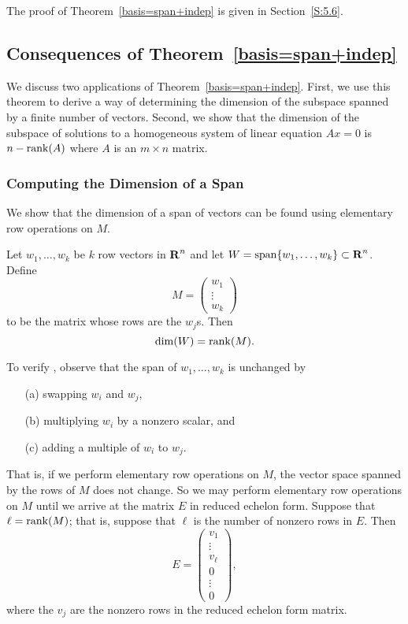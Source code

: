 \documentclass{ximera}
\begin{document}
The proof of Theorem~\ref{basis=span+indep} is given in Section~\ref{S:5.6}.


\subsection*{Consequences of Theorem~\protect\ref{basis=span+indep}}

We discuss two applications of Theorem~\ref{basis=span+indep}.  First,
we use this theorem to derive a way of determining the dimension of the
subspace spanned by a finite number of vectors.  Second, we show that the
dimension of the subspace of solutions to a homogeneous system of linear
equation $Ax=0$ is $n-{\rm rank}(A)$ where $A$ is an $m\times n$ matrix.

\subsubsection*{Computing the Dimension of a Span} 

We show that the dimension of a span of vectors can be found using
elementary row operations on $M$. 

\begin{lemma}  \label{L:computerank}
Let $w_1,\ldots,w_k$ be $k$ row vectors in $\mbox{$\bf{R}$}^n$ and let
$W={\rm span}\{w_1,\ldots,w_k\}\subset\mbox{$\bf{R}$}^n$.  Define
\[
M =\left(\begin{array}{c} w_1\\ \vdots \\w_k \end{array}\right)
\]
to be the matrix whose rows are the $w_j$s.  Then
\begin{equation}  \label{e:dimW=rankM}
\dim(W) = {\rm rank}(M).
\end{equation}
\end{lemma}

\proof To verify , observe that the span of
$w_1,\ldots,w_k$ is unchanged by
\begin{itemize}
\item[(a)] swapping $w_i$ and $w_j$,
\item[(b)] multiplying $w_i$ by a nonzero scalar, and
\item[(c)] adding a multiple of $w_i$ to $w_j$.
\end{itemize}
That is, if we perform elementary row operations on $M$, the
vector space spanned by the rows of $M$ does not change. So we
may perform elementary row operations on $M$ until we arrive at
the matrix $E$ in reduced echelon form.   
Suppose that $\ell={\rm rank}(M)$; that is, suppose that $\ell$
is the number of nonzero rows in $E$.  Then
\[
E =\left(\begin{array}{c} v_1\\ \vdots \\v_\ell\\ 0 \\ \vdots
\\ 0 \end{array}\right),
\]
where the $v_j$ are the nonzero rows in the reduced echelon form
matrix.
\end{document}
